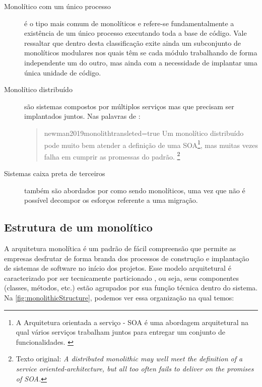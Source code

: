\begin{description}
    \item [Monolítico com um único processo] é o tipo mais comum de monolíticos e refere-se
        fundamentalmente a existência de um único processo executando toda a base de código. Vale
        ressaltar que dentro desta classificação exite ainda um subconjunto de monolíticos
        modulares nos quais têm se cada módulo trabalhando de forma independente um do outro, mas
        ainda com a necessidade de implantar uma única unidade de código.

    \item [Monolítico distribuído] são sistemas compostos por múltiplos serviços mas que precisam
        ser implantados juntos. Nas palavras de :

        \begin{quotation}{newman2019monolith}{transleted=true}
            Um monolítico distribuído pode muito bem atender a definição de uma
            \gls{SOA}\footnote{A Arquitetura orientada a serviço - SOA é uma abordagem arquitetural na qual
            vários serviços trabalham juntos para entregar um conjunto de funcionalidades.
            \cite{Newman2015}}, mas muitas vezes falha em cumprir as promessas do padrão.
            \footnote{Texto original: \textit{A distributed monolithic may well meet the definition of a
            service oriented-architecture, but all too often fails to deliver on the promises of SOA.}}
        \end{quotation}
    \item [Sistemas caixa preta de terceiros] também são abordados por 
        como sendo monolíticos, uma vez que não é possível decompor os esforços referente a uma
        migração.
\end{description}

\subsection{Estrutura de um monolítico}

A arquitetura monolítica é um padrão de fácil compreensão que permite as empresas desfrutar de forma
branda dos processos de construção e implantação de sistemas de software no início dos projetos.
Esse modelo arquitetural é caracterizado por ser tecnicamente particionado
\cite{Richards2020:FundamentalsOfSoftwareArchitecture}, ou seja, seus componentes
(classes, métodos, etc.) estão agrupados por sua função técnica dentro do sistema. Na
\autoref{fig:monolithicStructure}, podemos ver essa organização na qual temos:

